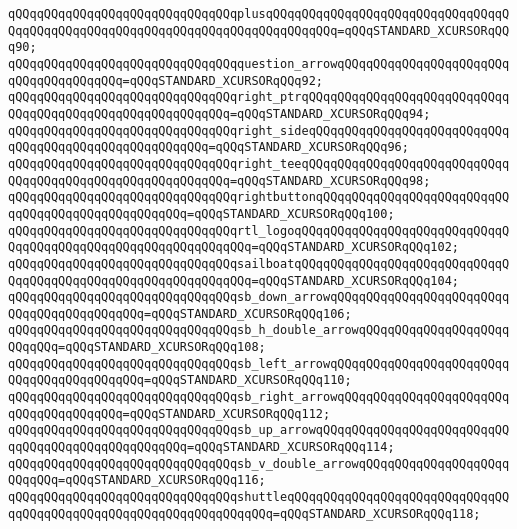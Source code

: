 \verb|qQQqqQQqqQQqqQQqqQQqqQQqqQQqqQQqplusqQQqqQQqqQQqqQQqqQQqqQQqqQQqqQQqqQQqqQQqqQQqqQQqqQQqqQQqqQQqqQQqqQQqqQQqqQQqqQQq=qQQqSTANDARD_XCURSORqQQq90;|\newline
\verb|qQQqqQQqqQQqqQQqqQQqqQQqqQQqqQQqquestion_arrowqQQqqQQqqQQqqQQqqQQqqQQqqQQqqQQqqQQqqQQq=qQQqSTANDARD_XCURSORqQQq92;|\newline
\verb|qQQqqQQqqQQqqQQqqQQqqQQqqQQqqQQqright_ptrqQQqqQQqqQQqqQQqqQQqqQQqqQQqqQQqqQQqqQQqqQQqqQQqqQQqqQQqqQQq=qQQqSTANDARD_XCURSORqQQq94;|\newline
\verb|qQQqqQQqqQQqqQQqqQQqqQQqqQQqqQQqright_sideqQQqqQQqqQQqqQQqqQQqqQQqqQQqqQQqqQQqqQQqqQQqqQQqqQQqqQQq=qQQqSTANDARD_XCURSORqQQq96;|\newline
\verb|qQQqqQQqqQQqqQQqqQQqqQQqqQQqqQQqright_teeqQQqqQQqqQQqqQQqqQQqqQQqqQQqqQQqqQQqqQQqqQQqqQQqqQQqqQQqqQQq=qQQqSTANDARD_XCURSORqQQq98;|\newline
\verb|qQQqqQQqqQQqqQQqqQQqqQQqqQQqqQQqrightbuttonqQQqqQQqqQQqqQQqqQQqqQQqqQQqqQQqqQQqqQQqqQQqqQQqqQQq=qQQqSTANDARD_XCURSORqQQq100;|\newline
\verb|qQQqqQQqqQQqqQQqqQQqqQQqqQQqqQQqrtl_logoqQQqqQQqqQQqqQQqqQQqqQQqqQQqqQQqqQQqqQQqqQQqqQQqqQQqqQQqqQQqqQQq=qQQqSTANDARD_XCURSORqQQq102;|\newline
\verb|qQQqqQQqqQQqqQQqqQQqqQQqqQQqqQQqsailboatqQQqqQQqqQQqqQQqqQQqqQQqqQQqqQQqqQQqqQQqqQQqqQQqqQQqqQQqqQQqqQQq=qQQqSTANDARD_XCURSORqQQq104;|\newline
\verb|qQQqqQQqqQQqqQQqqQQqqQQqqQQqqQQqsb_down_arrowqQQqqQQqqQQqqQQqqQQqqQQqqQQqqQQqqQQqqQQqqQQq=qQQqSTANDARD_XCURSORqQQq106;|\newline
\verb|qQQqqQQqqQQqqQQqqQQqqQQqqQQqqQQqsb_h_double_arrowqQQqqQQqqQQqqQQqqQQqqQQqqQQq=qQQqSTANDARD_XCURSORqQQq108;|\newline
\verb|qQQqqQQqqQQqqQQqqQQqqQQqqQQqqQQqsb_left_arrowqQQqqQQqqQQqqQQqqQQqqQQqqQQqqQQqqQQqqQQqqQQq=qQQqSTANDARD_XCURSORqQQq110;|\newline
\verb|qQQqqQQqqQQqqQQqqQQqqQQqqQQqqQQqsb_right_arrowqQQqqQQqqQQqqQQqqQQqqQQqqQQqqQQqqQQqqQQq=qQQqSTANDARD_XCURSORqQQq112;|\newline
\verb|qQQqqQQqqQQqqQQqqQQqqQQqqQQqqQQqsb_up_arrowqQQqqQQqqQQqqQQqqQQqqQQqqQQqqQQqqQQqqQQqqQQqqQQqqQQq=qQQqSTANDARD_XCURSORqQQq114;|\newline
\verb|qQQqqQQqqQQqqQQqqQQqqQQqqQQqqQQqsb_v_double_arrowqQQqqQQqqQQqqQQqqQQqqQQqqQQq=qQQqSTANDARD_XCURSORqQQq116;|\newline
\verb|qQQqqQQqqQQqqQQqqQQqqQQqqQQqqQQqshuttleqQQqqQQqqQQqqQQqqQQqqQQqqQQqqQQqqQQqqQQqqQQqqQQqqQQqqQQqqQQqqQQqqQQq=qQQqSTANDARD_XCURSORqQQq118;|\newline
